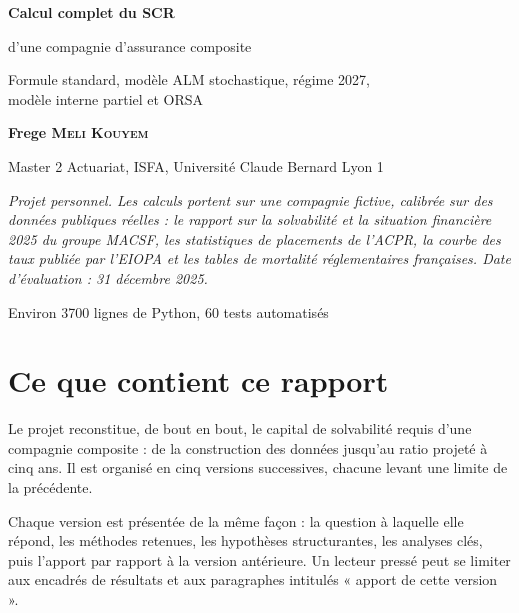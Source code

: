 \documentclass[11pt,a4paper]{article}
\begin{document}
\begin{titlepage}
\centering
\vspace*{2.5cm}
{\color{bleufonce}\Huge\bfseries Calcul complet du SCR\par}
\vspace{0.6cm}
{\color{bleufonce}\LARGE d'une compagnie d'assurance composite\par}
\vspace{1.2cm}
{\large Formule standard, modèle ALM stochastique, régime 2027,\\[2pt]
modèle interne partiel et ORSA\par}
\vspace{2.2cm}
{\large\bfseries Frege \textsc{Meli Kouyem}\par}
\vspace{0.3cm}
{Master 2 Actuariat, ISFA, Université Claude Bernard Lyon 1\par}
\vspace{2.5cm}
\begin{minipage}{0.82\linewidth}\small\itshape
Projet personnel. Les calculs portent sur une compagnie fictive, calibrée sur des données
publiques réelles : le rapport sur la solvabilité et la situation financière 2025 du groupe
MACSF, les statistiques de placements de l'ACPR, la courbe des taux publiée par l'EIOPA et les
tables de mortalité réglementaires françaises. Date d'évaluation : 31 décembre 2025.
\end{minipage}
\vfill
{\small Environ \num{3700} lignes de Python, 60 tests automatisés\par}
\end{titlepage}

\tableofcontents
\newpage

\section{Ce que contient ce rapport}

Le projet reconstitue, de bout en bout, le capital de solvabilité requis d'une compagnie
composite : de la construction des données jusqu'au ratio projeté à cinq ans. Il est organisé en
cinq versions successives, chacune levant une limite de la précédente.

Chaque version est présentée de la même façon : la question à laquelle elle répond, les méthodes
retenues, les hypothèses structurantes, les analyses clés, puis l'apport par rapport à la version
antérieure. Un lecteur pressé peut se limiter aux encadrés de résultats et aux paragraphes
intitulés « apport de cette version ».
\end{document}

